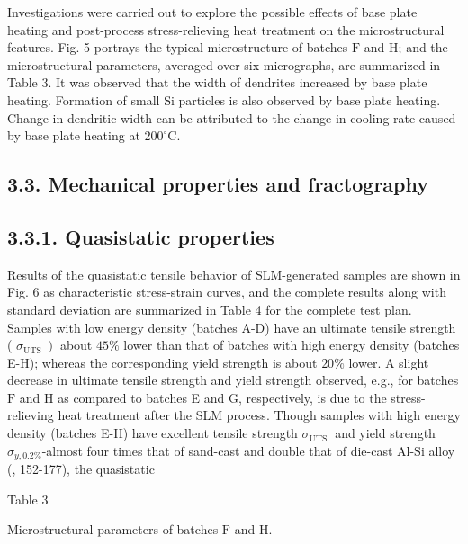\documentclass[10pt]{article}
\begin{document}
Investigations were carried out to explore the possible effects of base plate heating and post-process stress-relieving heat treatment on the microstructural features. Fig. 5 portrays the typical microstructure of batches $\mathrm{F}$ and $\mathrm{H}$; and the microstructural parameters, averaged over six micrographs, are summarized in Table 3. It was observed that the width of dendrites increased by base plate heating. Formation of small Si particles is also observed by base plate heating. Change in dendritic width can be attributed to the change in cooling rate caused by base plate heating at $200^{\circ} \mathrm{C}$.

\subsection*{3.3. Mechanical properties and fractography}
\subsection*{3.3.1. Quasistatic properties}
Results of the quasistatic tensile behavior of SLM-generated samples are shown in Fig. 6 as characteristic stress-strain curves, and the complete results along with standard deviation are summarized in Table 4 for the complete test plan. Samples with low energy density (batches A-D) have an ultimate tensile strength ( $\left.\sigma_{\text {UTS }}\right)$ about $45 \%$ lower than that of batches with high energy density (batches E-H); whereas the corresponding yield strength is about $20 \%$ lower. A slight decrease in ultimate tensile strength and yield strength observed, e.g., for batches $\mathrm{F}$ and $\mathrm{H}$ as compared to batches E and G, respectively, is due to the stress-relieving heat treatment after the SLM process. Though samples with high energy density (batches E-H) have excellent tensile strength $\sigma_{\text {UTS }}$ and yield strength $\sigma_{y, 0.2 \%}$-almost four times that of sand-cast and double that of die-cast Al-Si alloy (, 152-177), the quasistatic

Table 3

Microstructural parameters of batches $\mathrm{F}$ and $\mathrm{H}$.
\end{document}
